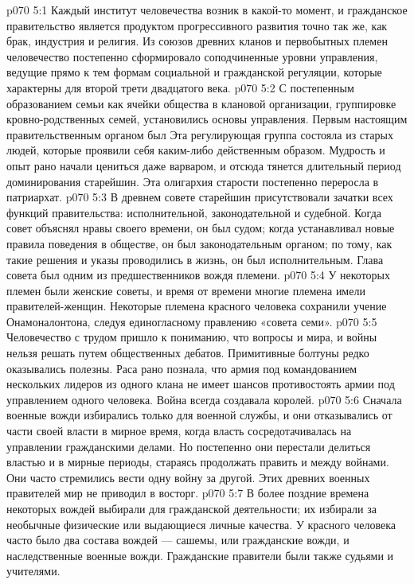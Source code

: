 \vs p070 5:1 Каждый институт человечества возник в какой\hyp{}то момент, и гражданское правительство является продуктом прогрессивного развития точно так же, как брак, индустрия и религия. Из союзов древних кланов и первобытных племен человечество постепенно сформировало соподчиненные уровни управления, ведущие прямо к тем формам социальной и гражданской регуляции, которые характерны для второй трети двадцатого века.
\vs p070 5:2 С постепенным образованием семьи как ячейки общества в клановой организации, группировке кровно\hyp{}родственных семей, установились основы управления. Первым настоящим правительственным органом был  Эта регулирующая группа состояла из старых людей, которые проявили себя каким\hyp{}либо действенным образом. Мудрость и опыт рано начали цениться даже варваром, и отсюда тянется длительный период доминирования старейшин. Эта олигархия старости постепенно переросла в патриархат.
\vs p070 5:3 В древнем совете старейшин присутствовали зачатки всех функций правительства: исполнительной, законодательной и судебной. Когда совет объяснял нравы своего времени, он был судом; когда устанавливал новые правила поведения в обществе, он был законодательным органом; по тому, как такие решения и указы проводились в жизнь, он был исполнительным. Глава совета был одним из предшественников вождя племени.
\vs p070 5:4 У некоторых племен были женские советы, и время от времени многие племена имели правителей\hyp{}женщин. Некоторые племена красного человека сохранили учение Онамоналонтона, следуя единогласному правлению «совета семи».
\vs p070 5:5 \pc Человечество с трудом пришло к пониманию, что вопросы и мира, и войны нельзя решать путем общественных дебатов. Примитивные болтуны редко оказывались полезны. Раса рано познала, что армия под командованием нескольких лидеров из одного клана не имеет шансов противостоять армии под управлением одного человека. Война всегда создавала королей.
\vs p070 5:6 \pc Сначала военные вожди избирались только для военной службы, и они отказывались от части своей власти в мирное время, когда власть сосредотачивалась на управлении гражданскими делами. Но постепенно они перестали делиться властью и в мирные периоды, стараясь продолжать править и между войнами. Они часто стремились вести одну войну за другой. Этих древних военных правителей мир не приводил в восторг.
\vs p070 5:7 В более поздние времена некоторых вождей выбирали для гражданской деятельности; их избирали за необычные физические или выдающиеся личные качества. У красного человека часто было два состава вождей --- сашемы, или гражданские вожди, и наследственные военные вожди. Гражданские правители были также судьями и учителями.
